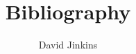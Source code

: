\documentclass[a4paper,10pt]{article}
\title{Bibliography}
\author{David Jinkins}
\begin{document}
\maketitle

\nocite{Blochetal2004}
\nocite{BanerjeeDuflo2007}
\nocite{Caietal2010}
\nocite{GustafssonShi2006}
\nocite{Podoshenetal2010}
\nocite{Pollak1976}
\nocite{Duesenberry1949}
\nocite{Heffetz2011}



\end{document}
